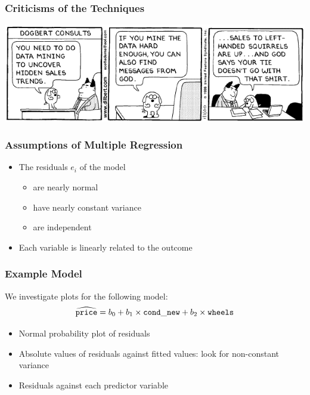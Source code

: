 \documentclass[handout]{beamer}
\begin{document}
\begin{frame}[fragile]
\frametitle{Criticisms of the Techniques}
\begin{center}
\includegraphics[width=\textwidth]{figure/dilbert.png}
\end{center}
\end{frame}


\begin{frame}[fragile]
\frametitle{Assumptions of Multiple Regression}

\begin{itemize}
\pause\item The residuals $e_i$ of the model 
\begin{itemize}
\pause\item are nearly normal
\pause\item have nearly constant variance
\pause\item are independent
\end{itemize}
\pause\item Each variable is linearly related to the outcome
\end{itemize}

\end{frame}


\begin{frame}[fragile]
\frametitle{Example Model}
We investigate plots for the following model:
\[
\widehat{{\tt price}} = b_0 + b_1 \times {\tt cond\_new} + b_2 \times {\tt wheels}
\]

\pause
\begin{itemize}
\pause\item Normal probability plot of residuals
\item Absolute values of residuals against fitted values: look for non-constant variance
\pause\item Residuals against each predictor variable
\end{itemize}

\end{frame}
\end{document}
